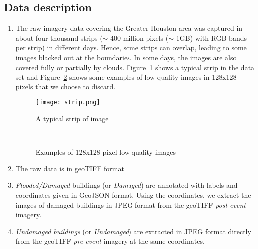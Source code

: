 \documentclass[journal, 12pt, onecolumn,draftclsnofoot]{IEEEtran}
\begin{document}
\subsection{Data description}
\begin{enumerate}
    \item The raw imagery data covering the Greater Houston area was captured in about four thousand strips ($\sim$ 400 million pixels ($\sim$ 1GB) with RGB bands per strip) in different days. Hence, some strips can overlap, leading to some images blacked out at the boundaries. In some days, the images are also covered fully or partially by clouds.
Figure~\ref{fig:strip} shows a typical strip in the data set and Figure~\ref{fig:bad_images} shows some examples of low quality images in 128x128 pixels that we choose to discard.


\begin{figure}[h]{\centering
\texttt{[image: strip.png]} \\
\centering\caption{\small{A typical strip of image}}
\label{fig:strip}
}
\end{figure}


\begin{figure}[h]{\centering
{}
\\
\caption{\small{Examples of 128x128-pixel low quality images}}
\label{fig:bad_images}
}
\end{figure}

    \item The raw data is in geoTIFF format
    \item \textit{Flooded/Damaged} buildings (or \textit{Damaged}) are annotated with labels and coordinates given in GeoJSON format. Using the coordinates, we extract the images of damaged buildings in JPEG format from the geoTIFF \textit{post-event} imagery. 
    \item \textit{Undamaged buildings} (or \textit{Undamaged}) are extracted in JPEG format directly from the geoTIFF \textit{pre-event} imagery at the same coordinates.
\end{enumerate}
\end{document}
